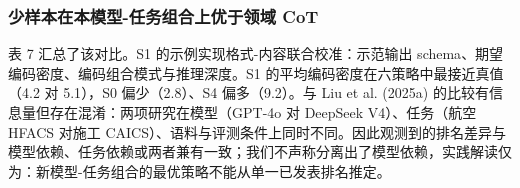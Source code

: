 \documentclass[11pt]{article}
\begin{document}
\subsubsection{{\cjkfont 少\allowbreak 样\allowbreak 本\allowbreak 在\allowbreak 本\allowbreak 模\allowbreak 型}-{\cjkfont 任\allowbreak 务\allowbreak 组\allowbreak 合\allowbreak 上\allowbreak 优\allowbreak 于\allowbreak 领\allowbreak 域} CoT}
{\cjkfont 表} 7 {\cjkfont 汇\allowbreak 总\allowbreak 了\allowbreak 该\allowbreak 对\allowbreak 比\allowbreak 。}S1 {\cjkfont 的\allowbreak 示\allowbreak 例\allowbreak 实\allowbreak 现\allowbreak 格\allowbreak 式}-{\cjkfont 内\allowbreak 容\allowbreak 联\allowbreak 合\allowbreak 校\allowbreak 准\allowbreak ：\allowbreak 示\allowbreak 范\allowbreak 输\allowbreak 出} schema{\cjkfont 、\allowbreak 期\allowbreak 望\allowbreak 编\allowbreak 码\allowbreak 密\allowbreak 度\allowbreak 、\allowbreak 编\allowbreak 码\allowbreak 组\allowbreak 合\allowbreak 模\allowbreak 式\allowbreak 与\allowbreak 推\allowbreak 理\allowbreak 深\allowbreak 度\allowbreak 。}S1 {\cjkfont 的\allowbreak 平\allowbreak 均\allowbreak 编\allowbreak 码\allowbreak 密\allowbreak 度\allowbreak 在\allowbreak 六\allowbreak 策\allowbreak 略\allowbreak 中\allowbreak 最\allowbreak 接\allowbreak 近\allowbreak 真\allowbreak 值\allowbreak （}4.2 {\cjkfont 对} 5.1{\cjkfont ）\allowbreak ，}S0 {\cjkfont 偏\allowbreak 少\allowbreak （}2.8{\cjkfont ）\allowbreak 、}S4 {\cjkfont 偏\allowbreak 多\allowbreak （}9.2{\cjkfont ）\allowbreak 。\allowbreak 与} Liu et al. (2025a) {\cjkfont 的\allowbreak 比\allowbreak 较\allowbreak 有\allowbreak 信\allowbreak 息\allowbreak 量\allowbreak 但\allowbreak 存\allowbreak 在\allowbreak 混\allowbreak 淆\allowbreak ：\allowbreak 两\allowbreak 项\allowbreak 研\allowbreak 究\allowbreak 在\allowbreak 模\allowbreak 型\allowbreak （}GPT-4o {\cjkfont 对} DeepSeek V4{\cjkfont ）\allowbreak 、\allowbreak 任\allowbreak 务\allowbreak （\allowbreak 航\allowbreak 空} HFACS {\cjkfont 对\allowbreak 施\allowbreak 工} CAICS{\cjkfont ）\allowbreak 、\allowbreak 语\allowbreak 料\allowbreak 与\allowbreak 评\allowbreak 测\allowbreak 条\allowbreak 件\allowbreak 上\allowbreak 同\allowbreak 时\allowbreak 不\allowbreak 同\allowbreak 。\allowbreak 因\allowbreak 此\allowbreak 观\allowbreak 测\allowbreak 到\allowbreak 的\allowbreak 排\allowbreak 名\allowbreak 差\allowbreak 异\allowbreak 与\allowbreak 模\allowbreak 型\allowbreak 依\allowbreak 赖\allowbreak 、\allowbreak 任\allowbreak 务\allowbreak 依\allowbreak 赖\allowbreak 或\allowbreak 两\allowbreak 者\allowbreak 兼\allowbreak 有\allowbreak 一\allowbreak 致\allowbreak ；\allowbreak 我\allowbreak 们\allowbreak 不\allowbreak 声\allowbreak 称\allowbreak 分\allowbreak 离\allowbreak 出\allowbreak 了\allowbreak 模\allowbreak 型\allowbreak 依\allowbreak 赖\allowbreak ，\allowbreak 实\allowbreak 践\allowbreak 解\allowbreak 读\allowbreak 仅\allowbreak 为\allowbreak ：\allowbreak 新\allowbreak 模\allowbreak 型}-{\cjkfont 任\allowbreak 务\allowbreak 组\allowbreak 合\allowbreak 的\allowbreak 最\allowbreak 优\allowbreak 策\allowbreak 略\allowbreak 不\allowbreak 能\allowbreak 从\allowbreak 单\allowbreak 一\allowbreak 已\allowbreak 发\allowbreak 表\allowbreak 排\allowbreak 名\allowbreak 推\allowbreak 定\allowbreak 。}
\end{document}
